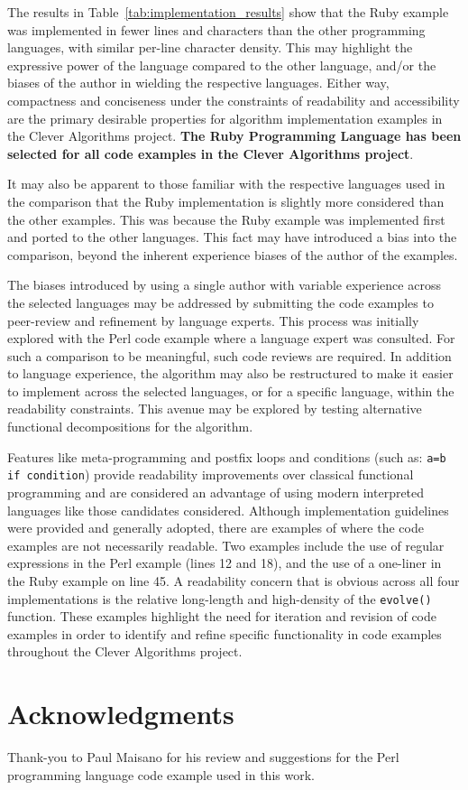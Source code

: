 \documentclass[a4paper, 11pt]{article}
\begin{document}
The results in Table~\ref{tab:implementation_results} show that the Ruby example was implemented in fewer lines and characters than the other programming languages, with similar per-line character density. This may highlight the expressive power of the language compared to the other language, and/or the biases of the author in wielding the respective languages. Either way, compactness and conciseness under the constraints of readability and accessibility are the primary desirable properties for algorithm implementation examples in the Clever Algorithms project. \textbf{The Ruby Programming Language has been selected for all code examples in the Clever Algorithms project}. 

It may also be apparent to those familiar with the respective languages used in the comparison that the Ruby implementation is slightly more considered than the other examples. This was because the Ruby example was implemented first and ported to the other languages. This fact may have introduced a bias into the comparison, beyond the inherent experience biases of the author of the examples.

The biases introduced by using a single author with variable experience across the selected languages may be addressed by submitting the code examples to peer-review and refinement by language experts. This process was initially explored with the Perl code example where a language expert was consulted. For such a comparison to be meaningful, such code reviews are required.
In addition to language experience, the algorithm may also be restructured to make it easier to implement across the selected languages, or for a specific language, within the readability constraints. This avenue may be explored by testing alternative functional decompositions for the algorithm. 

Features like meta-programming and postfix loops and conditions (such as: \texttt{a=b if condition}) provide readability improvements over classical functional programming and are considered an advantage of using modern interpreted languages like those candidates considered. 
Although implementation guidelines were provided and generally adopted, there are examples of where the code examples are not necessarily readable. Two examples include the use of regular expressions in the Perl example (lines 12 and 18), and the use of a one-liner in the Ruby example on line 45. A readability concern that is obvious across all four implementations is the relative long-length and high-density of the \texttt{evolve()} function.
These examples highlight the need for iteration and revision of code examples in order to identify and refine specific functionality in code examples throughout the Clever Algorithms project.

% 
% 
\section{Acknowledgments}
\label{sec:acknowledgments}
Thank-you to Paul Maisano for his review and suggestions for the Perl programming language code example used in this work.



\end{document}
